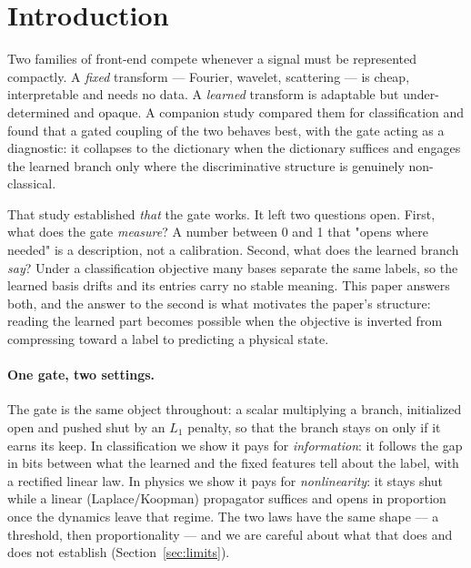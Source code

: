 \documentclass[11pt,a4paper]{article}
\begin{document}
\begin{abstract}
and \wpRollGainMlpOod$\times$ better, and it never creates energy, while the one-step structured surrogate diverges at any amplitude above training. Rollout training then improves it a further \wpHardGain$\times$. Two settings are two, not a universal law; what they share is the functional form of the gate and the controls that keep it honest.
\end{abstract}

\section{Introduction}
Two families of front-end compete whenever a signal must be represented compactly. A \emph{fixed} transform — Fourier, wavelet, scattering — is cheap, interpretable and needs no data. A \emph{learned} transform is adaptable but under-determined and opaque. A companion study \cite{flob} compared them for classification and found that a gated coupling of the two behaves best, with the gate acting as a diagnostic: it collapses to the dictionary when the dictionary suffices and engages the learned branch only where the discriminative structure is genuinely non-classical.

That study established \emph{that} the gate works. It left two questions open. First, what does the gate \emph{measure}? A number between 0 and 1 that "opens where needed" is a description, not a calibration. Second, what does the learned branch \emph{say}? Under a classification objective many bases separate the same labels, so the learned basis drifts and its entries carry no stable meaning. This paper answers both, and the answer to the second is what motivates the paper's structure: reading the learned part becomes possible when the objective is inverted from compressing toward a label to predicting a physical state.

\paragraph{One gate, two settings.} The gate is the same object throughout: a scalar multiplying a branch, initialized open and pushed shut by an $L_1$ penalty, so that the branch stays on only if it earns its keep. In classification we show it pays for \emph{information}: it follows the gap in bits between what the learned and the fixed features tell about the label, with a rectified linear law. In physics we show it pays for \emph{nonlinearity}: it stays shut while a linear (Laplace/Koopman) propagator suffices and opens in proportion once the dynamics leave that regime. The two laws have the same shape — a threshold, then proportionality — and we are careful about what that does and does not establish (Section~\ref{sec:limits}).
\end{document}
